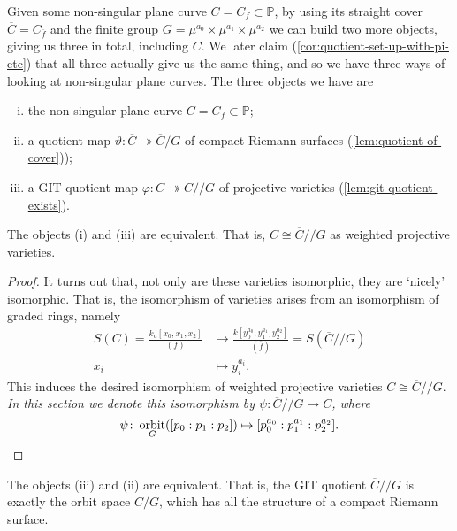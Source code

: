 \documentclass[10pt,notitlepage]{article}
\numberwithin{equation}{subsection}
\DeclareMathOperator{\orbit}{orbit}
\newcommand{\pee}{\mathbb{P}}
\newcommand{\cover}[1]{\overline{#1}}
\newcommand{\kathree}{k_a[x_0,x_1,x_2]}
\newcommand{\sslash}{/\!\!/}
\begin{document}
        Given some non-singular plane curve $C=C_f\subset\pee$, by using its straight cover $\cover{C}=C_{\cover{f}}$ and the finite group $G=\mu^{a_0}\times\mu^{a_1}\times\mu^{a_2}$ we can build two more objects, giving us three in total, including $C$.
        We later claim (\cref{cor:quotient-set-up-with-pi-etc}) that all three actually give us the same thing, and so we have three ways of looking at non-singular plane curves.
        The three objects we have are
        \begin{enumerate}[(i)]
            \item the non-singular plane curve $C=C_f\subset\pee$;
            \item a quotient map $\vartheta\colon\cover{C}\twoheadrightarrow\cover{C}/G$ of compact Riemann surfaces (\cref{lem:quotient-of-cover}));
            \item a GIT quotient map $\varphi\colon\cover{C}\twoheadrightarrow\cover{C}\sslash G$ of projective varieties (\cref{lem:git-quotient-exists}).
        \end{enumerate}

        \begin{theorem}\label{thm:i-and-iii-equiv}
            The objects (i) and (iii) are equivalent.
            That is, $C\cong\cover{C}\sslash G$ as weighted projective varieties.
        \end{theorem}

        \begin{proof}
            It turns out that, not only are these varieties isomorphic, they are `nicely' isomorphic.
            That is, the isomorphism of varieties arises from an isomorphism of graded rings, namely
            \begin{align*}
                S(C) = \frac{\kathree}{(f)} &\rightarrow \frac{k[y_0^{a_0},y_1^{a_1},y_2^{a_2}]}{(\cover{f})} = S(\cover{C}\sslash G)\\
                x_i &\mapsto y_i^{a_i}.
            \end{align*}
            This induces the desired isomorphism of weighted projective varieties $C\cong\cover{C}\sslash G$.
            \emph{In this section we denote this isomorphism by $\psi\colon \cover{C}\sslash G\to C$, where
            \[
                \psi\colon\orbit_G([p_0:p_1:p_2])\mapsto[p_0^{a_0}:p_1^{a_1}:p_2^{a_2}].\qedhere
            \]}
        \end{proof}

        \begin{lemma}\label{lem:git-quotient-is-orbit-space}
            The objects (iii) and (ii) are equivalent.
            That is, the GIT quotient $\cover{C}\sslash G$ is exactly the orbit space $\cover{C}/G$, which has all the structure of a compact Riemann surface.
        \end{lemma}
\end{document}
